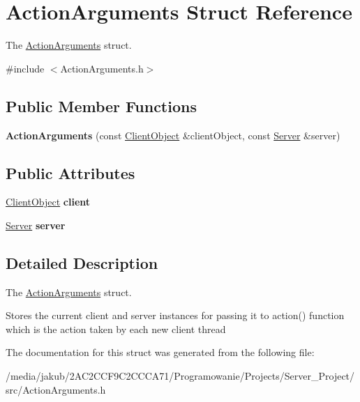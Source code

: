 \hypertarget{structActionArguments}{}\section{Action\+Arguments Struct Reference}
\label{structActionArguments}


The \hyperlink{structActionArguments}{Action\+Arguments} struct.  




{\ttfamily \#include $<$Action\+Arguments.\+h$>$}

\subsection*{Public Member Functions}
\begin{DoxyCompactItemize}
\item 
\mbox{\label{structActionArguments_ae24da221c0d81ebf3d7031a5a64a403c}} 
{\bfseries Action\+Arguments} (const \hyperlink{classClientObject}{Client\+Object} \&client\+Object, const \hyperlink{classServer}{Server} \&server)
\end{DoxyCompactItemize}
\subsection*{Public Attributes}
\begin{DoxyCompactItemize}
\item 
\mbox{\label{structActionArguments_a4e375ff0177e8f656b5d33192906df03}} 
\hyperlink{classClientObject}{Client\+Object} {\bfseries client}
\item 
\mbox{\label{structActionArguments_abc07601b2ab207b8a2df9d42ce815664}} 
\hyperlink{classServer}{Server} {\bfseries server}
\end{DoxyCompactItemize}


\subsection{Detailed Description}
The \hyperlink{structActionArguments}{Action\+Arguments} struct. 

Stores the current client and server instances for passing it to action() function which is the action taken by each new client thread 

The documentation for this struct was generated from the following file\+:\begin{DoxyCompactItemize}
\item 
/media/jakub/2\+A\+C2\+C\+C\+F9\+C2\+C\+C\+C\+A71/\+Programowanie/\+Projects/\+Server\+\_\+\+Project/src/Action\+Arguments.\+h\end{DoxyCompactItemize}
